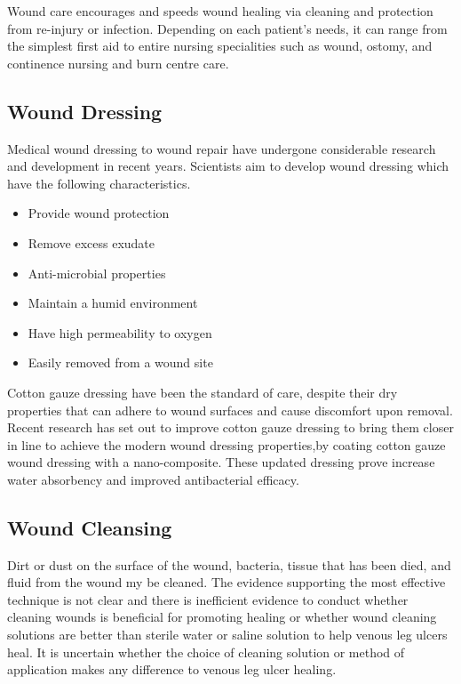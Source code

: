 \documentclass[12pt]{article}
\begin{document}
Wound care encourages and speeds wound healing via cleaning and protection from re-injury or infection. Depending on each patient's needs, it can range from the simplest first aid to entire nursing specialities such as wound, ostomy, and continence nursing and burn centre care.

\subsection{Wound Dressing}   
Medical wound dressing to wound repair have undergone considerable research and development  in recent years. Scientists aim to develop wound dressing which have the following characteristics.
\begin{itemize}
\item Provide wound protection 
\item Remove excess exudate
\item Anti-microbial properties
\item Maintain a humid environment 
\item Have high permeability to oxygen
\item Easily removed from a wound site 
\end{itemize}
Cotton gauze dressing have been the standard of care, despite their dry properties that can adhere to wound surfaces and cause discomfort upon removal. Recent research has set out to improve cotton gauze dressing to bring them closer in line to achieve the modern wound dressing properties,by coating cotton gauze wound dressing with a nano-composite. These updated dressing prove increase water absorbency and improved antibacterial efficacy.

\subsection{Wound Cleansing} 
Dirt or dust on the surface of the wound, bacteria, tissue that has been died, and fluid from the wound my be cleaned. The evidence supporting the most effective technique is not clear and there is inefficient evidence to conduct whether cleaning wounds is beneficial for promoting healing or whether wound cleaning solutions are better than sterile water or saline solution to help venous leg ulcers heal. It is uncertain whether the choice of cleaning solution or method of application makes any difference to venous leg ulcer healing. 
\end{document}

